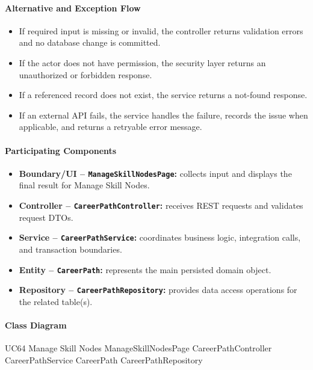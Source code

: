 \paragraph{Alternative and Exception Flow}

\begin{itemize}
    \item If required input is missing or invalid, the controller returns validation errors and no database change is committed.
    \item If the actor does not have permission, the security layer returns an unauthorized or forbidden response.
    \item If a referenced record does not exist, the service returns a not-found response.
    \item If an external API fails, the service handles the failure, records the issue when applicable, and returns a retryable error message.
\end{itemize}

\paragraph{Participating Components}

\begin{itemize}
    \item \textbf{Boundary/UI -- \texttt{ManageSkillNodesPage}:} collects input and displays the final result for Manage Skill Nodes.
    \item \textbf{Controller -- \texttt{CareerPathController}:} receives REST requests and validates request DTOs.
    \item \textbf{Service -- \texttt{CareerPathService}:} coordinates business logic, integration calls, and transaction boundaries.
    \item \textbf{Entity -- \texttt{CareerPath}:} represents the main persisted domain object.
    \item \textbf{Repository -- \texttt{CareerPathRepository}:} provides data access operations for the related table(s).
\end{itemize}

\paragraph{Class Diagram}

\ClassDiagram
{UC64 Manage Skill Nodes}
{ManageSkillNodesPage}
{CareerPathController}
{CareerPathService}
{CareerPath}
{CareerPathRepository}

